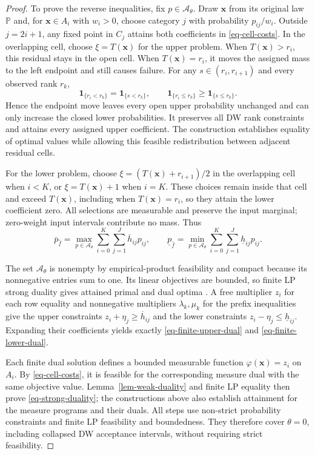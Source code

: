 \documentclass[review,11pt,3p,authoryear,nopreprintline]{elsarticle}
\begin{document}
\begin{proof}
  To prove the reverse inequalities, fix $p\in\mathcal A_\theta$. Draw $\bm x$ from its original law $\mathbb P$ and, for $\bm x\in A_i$ with $w_i>0$, choose category $j$ with probability $p_{ij}/w_i$. Outside $j=2i+1$, any fixed point in $C_j$ attains both coefficients in \eqref{eq-cell-costs}. In the overlapping cell, choose $\xi=T(\bm x)$ for the upper problem. When $T(\bm x)>r_i$, this residual stays in the open cell. When $T(\bm x)=r_i$, it moves the assigned mass to the left endpoint and still causes failure. For any $s\in(r_i,r_{i+1})$ and every observed rank $r_k$,
  \[
    \mathbf1_{\{r_i<r_k\}}=\mathbf1_{\{s<r_k\}},\qquad
    \mathbf1_{\{r_i\le r_k\}}\ge\mathbf1_{\{s\le r_k\}}.
  \]
  Hence the endpoint move leaves every open upper probability unchanged and can only increase the closed lower probabilities. It preserves all DW rank constraints and attains every assigned upper coefficient. The construction establishes equality of optimal values while allowing this feasible redistribution between adjacent residual cells.

  For the lower problem, choose $\xi=(T(\bm x)+r_{i+1})/2$ in the overlapping cell when $i<K$, or $\xi=T(\bm x)+1$ when $i=K$. These choices remain inside that cell and exceed $T(\bm x)$, including when $T(\bm x)=r_i$, so they attain the lower coefficient zero. All selections are measurable and preserve the input marginal; zero-weight input intervals contribute no mass. Thus
  \begin{equation}
    \overline p_{\hat f}=\max_{p\in\mathcal A_\theta}\sum_{i=0}^K\sum_{j=1}^J\overline h_{ij}p_{ij},\qquad
    \underline p_{\hat f}=\min_{p\in\mathcal A_\theta}\sum_{i=0}^K\sum_{j=1}^J\underline h_{ij}p_{ij}.
    \label{eq-finite-primal-values}
  \end{equation}

  The set $\mathcal A_\theta$ is nonempty by empirical-product feasibility and compact because its nonnegative entries sum to one. Its linear objectives are bounded, so finite LP strong duality gives attained primal and dual optima \citep[Section~5.2.3]{B.V04}. A free multiplier $z_i$ for each row equality and nonnegative multipliers $\lambda_k,\mu_k$ for the prefix inequalities give the upper constraints $z_i+\eta_j\ge\overline h_{ij}$ and the lower constraints $z_i-\eta_j\le\underline h_{ij}$. Expanding their coefficients yields exactly \eqref{eq-finite-upper-dual} and \eqref{eq-finite-lower-dual}.

  Each finite dual solution defines a bounded measurable function $\varphi(\bm x)=z_i$ on $A_i$. By \eqref{eq-cell-costs}, it is feasible for the corresponding measure dual with the same objective value. Lemma~\ref{lem-weak-duality} and finite LP equality then prove \eqref{eq-strong-duality}; the constructions above also establish attainment for the measure programs and their duals. All steps use non-strict probability constraints and finite LP feasibility and boundedness. They therefore cover $\theta=0$, including collapsed DW acceptance intervals, without requiring strict feasibility.
\end{proof}
\end{document}
